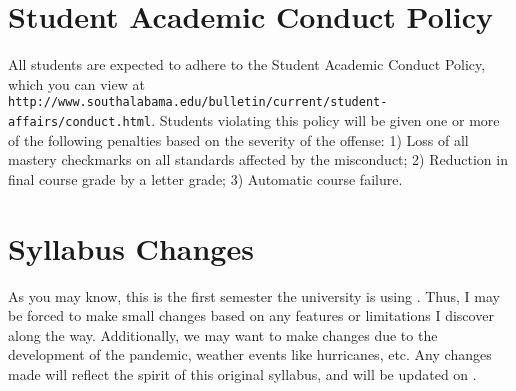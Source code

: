 \documentclass{article}
\begin{document}
\section*{\fontsize{12}{15}\selectfont Student Academic Conduct Policy}
All students are expected to adhere to the Student Academic Conduct Policy, which you can view at
{\tt http://www.southalabama.edu/bulletin/current/student-affairs/conduct.html}.  Students violating this policy will be given one or more of the following penalties based on the severity of the offense:  1) Loss of all mastery checkmarks on all standards affected by the misconduct; 2) Reduction in final course grade by a letter grade; 3) Automatic course failure.


\section*{\fontsize{12}{15}\selectfont Syllabus Changes}
As you may know, this is the first semester the university is using \LMS. Thus, I may be forced to make small changes based on any features or limitations I discover along the way. Additionally, we may want to make changes due to the development of the pandemic, weather events like hurricanes, etc. Any changes made will reflect the spirit of this original syllabus, and will be updated on \LMS.
\end{document}
